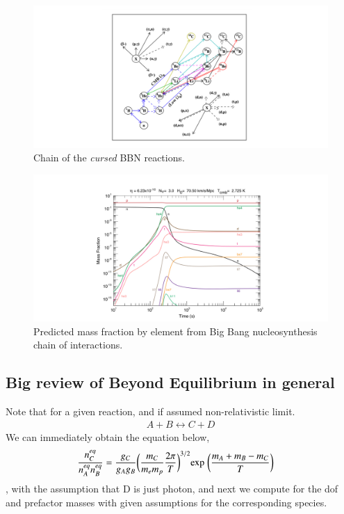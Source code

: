 \documentclass[a4paper, 12pt]{article}
\begin{document}
{{    \begin{figure}[h!]
    \begin{center}
      \includegraphics[scale=0.3]{Figures/cursedchain.jpeg}
    \end{center}
    \caption{Chain of the \textit{cursed} BBN reactions.}
    \label{fig:cursedchain}
    \end{figure}
    
    \begin{figure}[h!]
    \begin{center}
      \includegraphics[scale=0.3]{Figures/abundance.jpeg}
    \end{center}
    \caption{Predicted mass fraction by element from Big Bang
      nucleosynthesis chain of interactions.}
    \label{fig:abundance.jpeg}
    \end{figure}
    



  \subsection{Big review of Beyond Equilibrium in general}%
    \label{sub:Big review of Beyond Equilibrium in general}
    Note that for a given reaction, and if assumed non-relativistic
    limit. 
    \begin{align}
      \label{processeca}
      A + B \leftrightarrow C + D
    \end{align}
    We can immediately obtain the equation below, 
    \begin{align}
      \label{processeca ABCD}
   \frac{n_{C}^{eq}}{n_{A}^{eq} n_{B}^{eq}} &= \frac{g_C}{g_A g_B} \bigg(
  \frac{m_C}{m_e m_p} \frac{2\pi}{T} \bigg)^{3/2} \mathrm{exp}
  \hspace{0.1cm} \bigg( \frac{m_A + m_B - m_C}{T} \bigg) 
    \end{align}, with the assumption that D is just photon, and next we
    compute for the dof and prefactor masses with given assumptions
    for the corresponding species. 
   
}}
\end{document}
